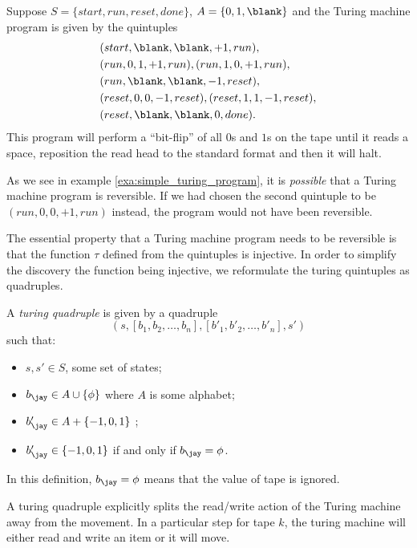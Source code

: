 \begin{example}\label{exa:simple_turing_program}
  Suppose $S=\{start,run,reset,done\}$, $A=\{0,1,\blank\}$ and the Turing machine program is given
  by the quintuples
  \begin{align*}
    &(start,\blank,\blank,+1,run),\\
    &(run,0,1,+1,run), (run,1,0,+1,run),\\
    &(run,\blank,\blank,-1,reset),\\
    &(reset,0,0,-1,reset),(reset,1,1,-1,reset),\\
    &(reset,\blank,\blank,0,done).
  \end{align*}
  This program will perform a ``bit-flip'' of all $0$s and $1$s on the tape until it reads a space,
  reposition the read head to the standard format and then it will halt.
\end{example}

As we see in example \vref{exa:simple_turing_program}, it is \emph{possible} that a Turing machine
program is reversible. If we had chosen the second quintuple to be $(run,0,0,+1,run)$ instead, the
program would not have been reversible.

The essential property that a Turing machine program needs to be reversible is that the function
$\tau$ defined from the quintuples is injective. In order to simplify the discovery the function
being injective, we reformulate the turing quintuples as quadruples.

\begin{definition}\label{def:turing_quadruple}
  A \emph{turing quadruple} is given by a quadruple
  \[
    (s,[b_1,b_2,\ldots,b_n],[b'_1,b'_2,\ldots,b'_n],s')
  \]
  such that:
  \begin{itemize}[{(}i{)}]
    \item $s,s'\in S$, some set of states;
    \item $b_\jay\in A  \cup \{\phi\}$ where $A$ is some alphabet;
    \item $b'_\jay\in A  + \{-1,0,1\}$ ;
    \item $b'_\jay \in \{-1,0,1\}$ if and only if $b_\jay = \phi$.
  \end{itemize}
  In this definition, $b_\jay = \phi$ means that the value of tape \jay is ignored.
\end{definition}

A turing quadruple explicitly splits the read/write action of the Turing machine away from the
movement. In a particular step for tape $k$, the turing machine will either read and write an item
or it will move.

